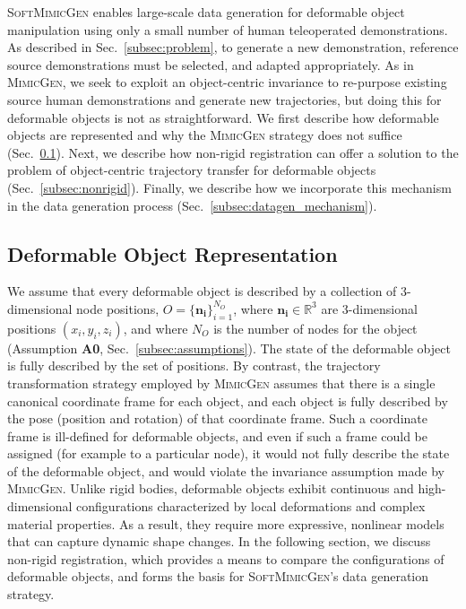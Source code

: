 \documentclass[letterpaper, 10 pt, conference]{ieeeconf}  %
\newcommand{\sysName}{\textsc{SoftMimicGen}\xspace}
\newcommand{\MimicGen}{\textsc{MimicGen}\xspace}
\begin{document}
\sysName enables large-scale data generation for deformable object manipulation using only a small number of human teleoperated demonstrations. As described in Sec.~\ref{subsec:problem}, to generate a new demonstration, reference source demonstrations must be selected, and adapted appropriately. As in \MimicGen, we seek to exploit an object-centric invariance to re-purpose existing source human demonstrations and generate new trajectories, but doing this for deformable objects is not as straightforward. We first describe how deformable objects are represented and why the \MimicGen strategy does not suffice (Sec.~\ref{subsec:deformable}). Next, we describe how non-rigid registration can offer a solution to the problem of object-centric trajectory transfer for deformable objects (Sec.~\ref{subsec:nonrigid}). Finally, we describe how we incorporate this mechanism in the data generation process (Sec.~\ref{subsec:datagen_mechanism}).


\subsection{Deformable Object Representation}
\label{subsec:deformable}


We assume that every deformable object is described by a collection of 3-dimensional node positions, $O = \{\mathbf{n_i}\}_{i=1}^{N_{O}}$, where $\mathbf{n_i} \in \mathbb{R}^3$ are 3-dimensional positions $(x_i, y_i, z_i)$, and where $N_O$ is the number of nodes for the object (Assumption \textbf{A0}, Sec.~\ref{subsec:assumptions}). The state of the deformable object is fully described by the set of positions. By contrast, the trajectory transformation strategy employed by \MimicGen assumes that there is a single canonical coordinate frame for each object, and each object is fully described by the pose (position and rotation) of that coordinate frame. Such a coordinate frame is ill-defined for deformable objects, and even if such a frame could be assigned (for example to a particular node), it would not fully describe the state of the deformable object, and would violate the invariance assumption made by \MimicGen. Unlike rigid bodies, deformable objects exhibit continuous and high-dimensional configurations characterized by local deformations and complex material properties. As a result, they require more expressive, nonlinear models that can capture dynamic shape changes. In the following section, we discuss non-rigid registration, which provides a means to compare the configurations of deformable objects, and forms the basis for \sysName's data generation strategy.
\end{document}
